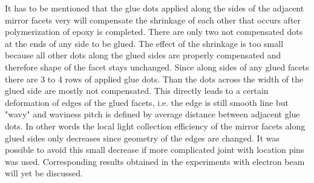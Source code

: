 It has to be mentioned that the glue dots applied along the sides of the adjacent mirror facets very will compensate the shrinkage of each other that occurs after polymerization of epoxy is completed. There are only two not compensated dots at the ends of any side to be glued. The effect of the shrinkage is too small because all other dots along the glued sides are properly compensated and therefore shape of the facet stays unchanged. Since along sides of any glued facets there are 3 to 4 rows of applied glue dots. Than the dots across the width of the glued side are mostly not compensated. This directly leads to a certain deformation of edges of the glued facets, i.e. the edge is still smooth line  but "wavy" and waviness pitch is defined by average distance between adjacent glue dots. In other words the local light collection efficiency of the mirror facets along glued sides only decreases since geometry of the edges are changed. It was possible to avoid this small decrease if more complicated joint with location pins was used. Corresponding results obtained in the experiments with electron beam will yet be discussed.

